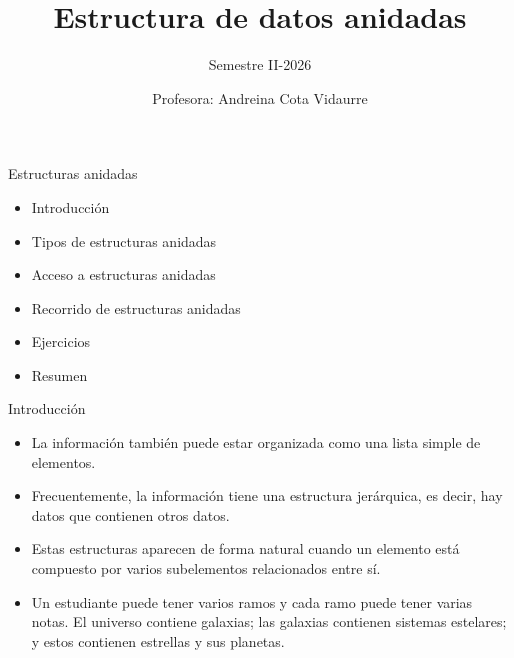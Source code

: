 \documentclass{beamer}
\title{Estructura de datos anidadas} %
\subtitle{Semestre II-2026} %
\author{Profesora: Andreina Cota Vidaurre}
\begin{document}
  \shorthandoff{-}
  \frame[c]{\maketitle}


    \begin{frame}{Estructuras anidadas}
        \begin{itemize}
            \item Introducción
            \item Tipos de estructuras anidadas
            \item Acceso a estructuras anidadas
            \item Recorrido de estructuras anidadas
            \item Ejercicios
            \item Resumen
        \end{itemize}
    \end{frame}

    \begin{frame}{Introducción}
        \begin{itemize}
            \item La información también puede estar organizada como una lista simple de elementos.
            \item Frecuentemente, la información tiene una estructura jerárquica, es decir, hay datos que contienen otros datos.
            \item Estas estructuras aparecen de forma natural cuando un elemento está compuesto por varios subelementos relacionados entre sí.
            \item Un estudiante puede tener varios ramos y cada ramo puede tener varias notas. 
            El universo contiene galaxias; las galaxias contienen sistemas estelares; y estos contienen estrellas y sus planetas.
        \end{itemize}
    \end{frame}
\end{document}
